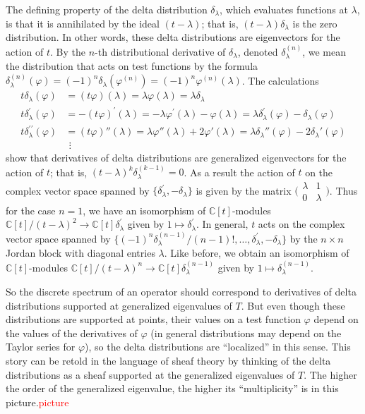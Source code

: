 \documentclass[11pt,leqno]{article}
\newcommand{\sai}[1]{\textcolor{red}{#1}}
\theoremstyle{plain}
\theoremstyle{definition}
\numberwithin{equation}{section}
\numberwithin{lem}{section}
\begin{document}
The defining property of the delta distribution $\delta_\lambda$, which evaluates functions at $\lambda$, is that it is annihilated by the ideal $(t-\lambda)$; that is, $(t-\lambda)\delta_\lambda$ is the zero distribution. In other words, these delta distributions are eigenvectors for the action of $t$. By the $n$-th distributional derivative of $\delta_\lambda$, denoted $\delta_\lambda^{(n)}$, we mean the distribution that acts on test functions by the formula $\delta_\lambda^{(n)}(\varphi) = (-1)^n\delta_\lambda(\varphi^{(n)}) = (-1)^n\varphi^{(n)}(\lambda)$. The calculations
\begin{align*}
	t\delta_\lambda(\varphi) &= (t\varphi)(\lambda) = \lambda\varphi(\lambda) = \lambda\delta_\lambda\\
	t\delta_\lambda^\prime(\varphi) &= -(t\varphi)^\prime(\lambda) = -\lambda \varphi^\prime(\lambda) - \varphi(\lambda)  = \lambda\delta_\lambda^\prime(\varphi) - \delta_\lambda(\varphi)\\
	t\delta_\lambda^{\prime\prime}(\varphi) &= (t\varphi)''(\lambda) = \lambda\varphi''(\lambda) + 2\varphi'(\lambda) = \lambda\delta_\lambda''(\varphi) -2\delta_\lambda'(\varphi)\\
	&~\,\vdots
\end{align*}
show that derivatives of delta distributions are generalized eigenvectors for the action of $t$; that is, $(t-\lambda)^k\delta_\lambda^{(k-1)} = 0$. As a result the action of $t$ on the complex vector space spanned by $\{\delta_\lambda^\prime, -\delta_\lambda\}$ is given by the matrix $\bigl(\!\begin{smallmatrix}
	\lambda & 1 \\ 0 & \lambda
\end{smallmatrix}\!\bigr)$. Thus for the case $n = 1$, we have an isomorphism of $\mathbb C[t]$-modules $\mathbb C[t]/(t-\lambda)^2\to \mathbb C[t]\delta_\lambda^\prime$ given by $1\mapsto \delta_\lambda^\prime$. In general, $t$ acts on the complex vector space spanned by $\{(-1)^n\delta_\lambda^{(n-1)}/(n-1)!,\dots,\delta_\lambda^\prime, -\delta_\lambda\}$ by the $n\times n$ Jordan block with diagonal entries $\lambda$. Like before, we obtain an isomorphism of $\mathbb C[t]$-modules $\mathbb C[t]/(t-\lambda)^n\to \mathbb C[t]\delta_\lambda^{(n-1)}$ given by $1\mapsto \delta_\lambda^{(n-1)}$.

So the discrete spectrum of an operator should correspond to derivatives of delta distributions supported at generalized eigenvalues of $T$. But even though these distributions are supported at points, their values on a test function $\varphi$ depend on the values of the derivatives of $\varphi$ (in general distributions may depend on the Taylor series for $\varphi$), so the delta distributions are ``localized'' in this sense. This story can be retold in the language of sheaf theory by thinking of the delta distributions as a sheaf supported at the generalized eigenvalues of $T$. The higher the order of the generalized eigenvalue, the higher its ``multiplicity'' is in this picture.\sai{picture}
\end{document}
